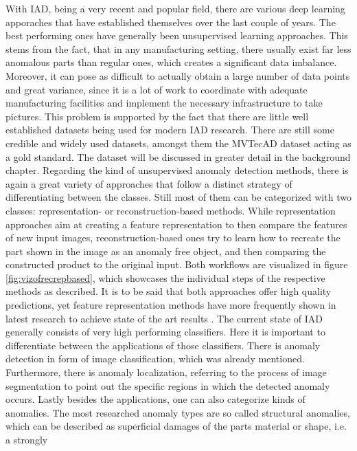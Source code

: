 With IAD, being a very recent and popular field, there are various deep learning apporaches that have established themselves over 
the last couple of years. The best performing ones have generally been unsupervised learning approaches. This stems from the fact, that 
in any manufacturing setting, there usually exist far less anomalous parts than regular ones, which creates a significant data imbalance. 
Moreover, it can pose as difficult to actually obtain a large number of data points and great variance, since it is a lot of work to 
coordinate with adequate manufacturing facilities and implement the necessary infrastructure to take pictures. This problem is supported 
by the fact that there are little well established datasets being used for modern IAD research. There are still some credible and widely used 
datasets, amongst them the MVTecAD \cite{MVTEC_Bergmann_2021} dataset acting as a gold standard. The dataset will be discussed in greater detail 
in the background chapter. Regarding the kind of unsupervised anomaly detection methods, there is again a great variety of approaches that follow a 
distinct strategy of differentiating between the classes. Still most of them can be categorized with two classes: representation- 
or reconstruction-based methods. While representation approaches aim at creating a feature representation to then 
compare the features of new input images, reconstruction-based ones try to learn how to recreate the part shown in the image as an anomaly 
free object, and then comparing the constructed product to the original input. Both workflows are visualized in figure \ref{fig:vizofrecrepbased}, which showcases 
the individual steps of the respective methods as described. It is to be said that both approaches offer high quality predictions, yet 
feature representation methods have more frequently shown in latest research to achieve state of the art results \cite{liu2024deep}. %
\newline
The current state of IAD generally consists of very high performing classifiers. Here it is important to differentiate between the  
applications of those classifiers. There is anomaly detection in form of image classification, which was already mentioned. 
Furthermore, there is anomaly localization, referring to the process of image segmentation to point out the specific regions in which 
the detected anomaly occurs. Lastly besides the applications, one can also categorize kinds of anomalies. The most researched anomaly types 
are so called structural anomalies, which can be described as superficial damages of the parts material or shape, i.e. a strongly 
